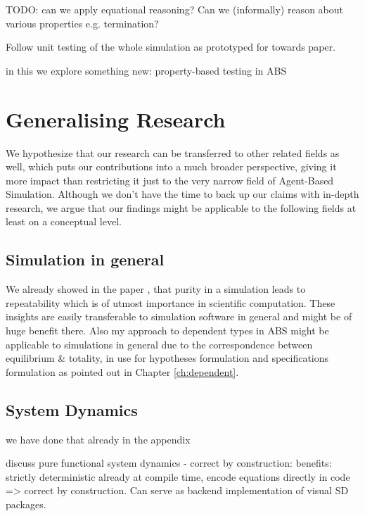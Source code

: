 TODO: can we apply equational reasoning? Can we (informally) reason about various properties e.g. termination?

Follow unit testing of the whole simulation as prototyped for towards paper.

in this we explore something new: property-based testing in ABS

\section{Generalising Research}
We hypothesize that our research can be transferred to other related fields as well, which puts our contributions into a much broader perspective, giving it more impact than restricting it just to the very narrow field of Agent-Based Simulation. Although we don't have the time to back up our claims with in-depth research, we argue that our findings might be applicable to the following fields at least on a conceptual level.

\subsection{Simulation in general}
We already showed in the paper \cite{thaler_pure_2019}, that purity in a simulation leads to repeatability which is of utmost importance in scientific computation. These insights are easily transferable to simulation software in general and might be of huge benefit there. Also my approach to dependent types in ABS might be applicable to simulations in general due to the correspondence between equilibrium \& totality, in use for hypotheses formulation and specifications formulation as pointed out in Chapter \ref{ch:dependent}. 

\subsection{System Dynamics}
\label{sub:generalising_system_dynamics}
we have done that already in the appendix

discuss pure functional system dynamics - correct by construction: benefits: strictly deterministic already at compile time, encode equations directly in code => correct by construction. Can serve as backend implementation of visual SD packages.

